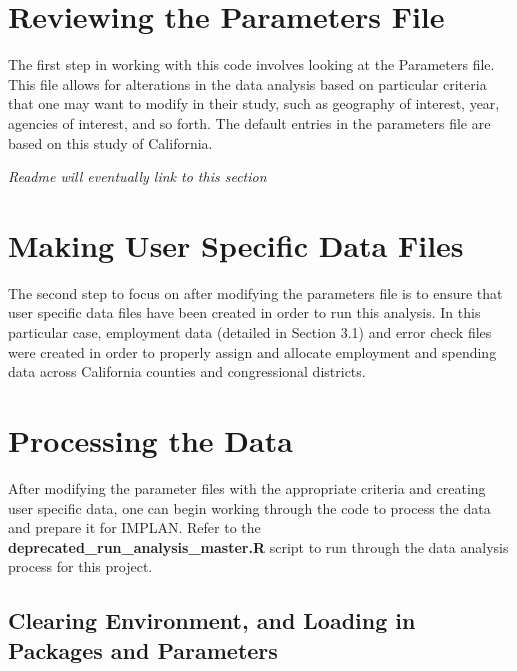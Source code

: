 \documentclass[
]{book}
\begin{document}
\hypertarget{reviewing-the-parameters-file}{%
\section{Reviewing the Parameters File}\label{reviewing-the-parameters-file}}

The first step in working with this code involves looking at the Parameters file. This file allows for alterations in the data analysis based on particular criteria that one may want to modify in their study, such as geography of interest, year, agencies of interest, and so forth. The default entries in the parameters file are based on this study of California.

\emph{Readme will eventually link to this section}

\hypertarget{making-user-specific-data-files}{%
\section{Making User Specific Data Files}\label{making-user-specific-data-files}}

The second step to focus on after modifying the parameters file is to ensure that user specific data files have been created in order to run this analysis. In this particular case, employment data (detailed in Section 3.1) and error check files were created in order to properly assign and allocate employment and spending data across California counties and congressional districts.

\hypertarget{processing-the-data}{%
\section{Processing the Data}\label{processing-the-data}}

After modifying the parameter files with the appropriate criteria and creating user specific data, one can begin working through the code to process the data and prepare it for IMPLAN. Refer to the \textbf{deprecated\_run\_analysis\_master.R} script to run through the data analysis process for this project.

\hypertarget{clearing-environment-and-loading-in-packages-and-parameters}{%
\subsection{Clearing Environment, and Loading in Packages and Parameters}\label{clearing-environment-and-loading-in-packages-and-parameters}}
\end{document}
